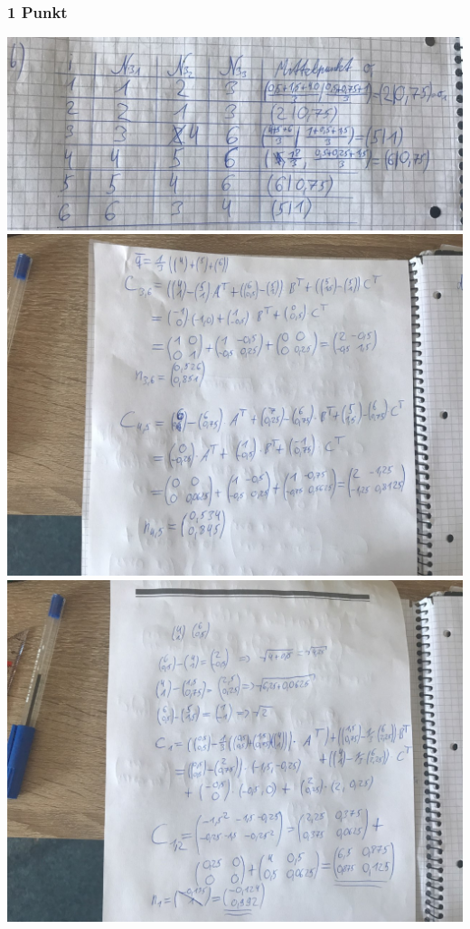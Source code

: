 \subsubsection{1 Punkt}
\includegraphics[scale=0.5]{3c.jpg}\\
\includegraphics[scale=0.3]{3bR.jpg}\\
\includegraphics[scale=0.3]{3bR2.jpg}
